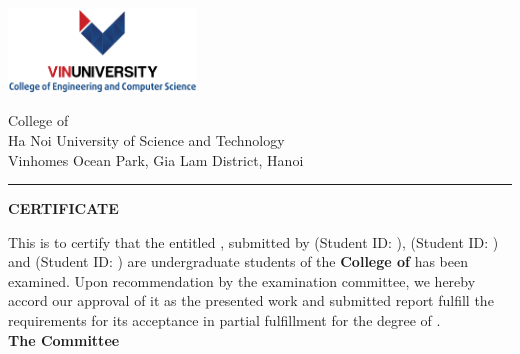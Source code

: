 \thispagestyle{plain}
\noindent
\begin{minipage}{0.37\textwidth}
\includegraphics[width=50mm]{Images/cecs_logo_full}
\end{minipage}
\begin{minipage}{0.63\textwidth}

 College of \College  \\
 Ha Noi University of Science and Technology\\
 Vinhomes Ocean Park, Gia Lam District, Hanoi
\end{minipage}

\vspace{0.5\baselineskip}
\hrule
\vspace{2\baselineskip}

\begin{center}
{\Large {\bf \uppercase{Certificate}}}
\end{center}




\vspace{\baselineskip}

\noindent 
This is to certify that the \MakeTextLowercase{\RoportType} entitled {\bf \ReportTitle}, submitted by {\bf \firstAuthor} (Student ID: {\firstAuthorID}), {\bf \secondAuthor} (Student ID: {\secondAuthorID}) and {\bf \thirdAuthor} (Student ID: {\thirdAuthorID}) are undergraduate students of the {\bf College of \College } has been examined. Upon recommendation by the examination committee, we hereby accord our approval of it as the presented work and submitted report fulfill the requirements for its acceptance in partial fulfillment for the degree of \emph{\Degree}. \\

\noindent\textbf{The Committee}

